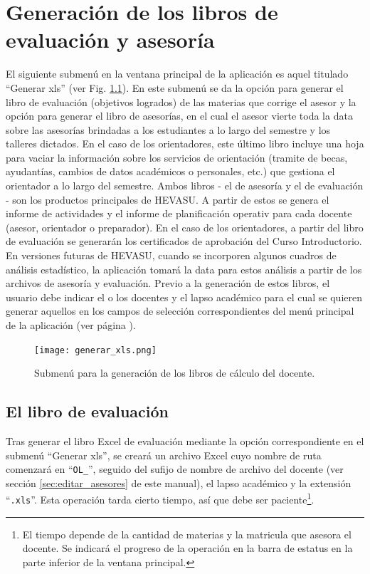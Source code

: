 \documentclass[letterpaper,12pt]{book}
\begin{document}
\chapter{Generación de los libros de evaluación y asesoría}\label{cap:generar_xls}

El siguiente submenú en la ventana principal de la aplicación es aquel titulado ``Generar xls'' (ver Fig. \ref{fig:generar_xls}). En este submenú se da la opción para generar el libro de evaluación (objetivos logrados) de las materias que corrige el asesor y la opción para generar el libro de asesorías, en el cual el asesor vierte toda la data sobre las asesorías brindadas a los estudiantes a lo largo del semestre y los talleres dictados. En el caso de los orientadores, este último libro incluye una hoja para vaciar la información sobre los servicios de orientación (tramite de becas, ayudantías, cambios de datos académicos o personales, etc.) que gestiona el orientador a lo largo del semestre. Ambos libros - el de asesoría y el de evaluación - son los productos principales de HEVASU. A partir de estos se genera el informe de actividades y el informe de planificación operativ para cada docente (asesor, orientador o preparador). En el caso de los orientadores, a partir del libro de evaluación se generarán los certificados de aprobación del Curso Introductorio. En versiones futuras de HEVASU, cuando se incorporen algunos cuadros de análisis estadístico, la aplicación tomará la data para estos análisis a partir de los archivos de asesoría y evaluación. Previo a la generación de estos libros, el usuario debe indicar el o los docentes y el lapso académico para el cual se quieren generar aquellos en los campos de selección correspondientes del menú principal de la aplicación (ver página \pageref{sec:selectores_principales}).

\begin{figure}[!ht]
  \centering
  \texttt{[image: generar\_xls.png]}
  \caption{Submenú para la generación de los libros de cálculo del docente.}
  \label{fig:generar_xls}
\end{figure}

\section{El libro de evaluación}

Tras generar el libro Excel de evaluación mediante la opción correspondiente en el submenú ``Generar xls'', se creará un archivo Excel cuyo nombre de ruta comenzará en ``\texttt{OL\_}'', seguido del sufijo de nombre de archivo del docente (ver sección \ref{sec:editar_asesores} de este manual), el lapso académico y la extensión ``\texttt{.xls}''.  Esta operación tarda cierto tiempo, así que debe ser paciente\footnote{El tiempo depende de la cantidad de materias y la matricula que asesora el docente. Se indicará el progreso de la operación en la barra de estatus en la parte inferior de la ventana principal.}.
\end{document}
